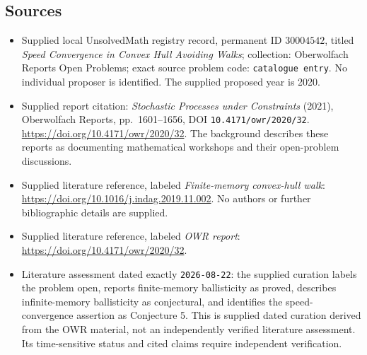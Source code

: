\documentclass[11pt]{article}
\begin{document}
\subsection{Sources}
\begin{itemize}
\item Supplied local UnsolvedMath registry record, permanent ID \(30004542\), titled \emph{Speed Convergence in Convex Hull Avoiding Walks}; collection: Oberwolfach Reports Open Problems; exact source problem code: \texttt{catalogue entry}. No individual proposer is identified. The supplied proposed year is 2020.
\item Supplied report citation: \emph{Stochastic Processes under Constraints} (2021), Oberwolfach Reports, pp.\ 1601--1656, DOI \texttt{10.4171/owr/2020/32}. \url{https://doi.org/10.4171/owr/2020/32}. The background describes these reports as documenting mathematical workshops and their open-problem discussions.
\item Supplied literature reference, labeled \emph{Finite-memory convex-hull walk}: \url{https://doi.org/10.1016/j.indag.2019.11.002}. No authors or further bibliographic details are supplied.
\item Supplied literature reference, labeled \emph{OWR report}: \url{https://doi.org/10.4171/owr/2020/32}.
\item Literature assessment dated exactly \texttt{2026-08-22}: the supplied curation labels the problem open, reports finite-memory ballisticity as proved, describes infinite-memory ballisticity as conjectural, and identifies the speed-convergence assertion as Conjecture 5. This is supplied dated curation derived from the OWR material, not an independently verified literature assessment. Its time-sensitive status and cited claims require independent verification.
\end{itemize}
\end{document}
